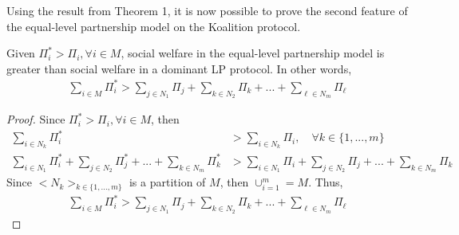 Using the result from Theorem 1, it is now possible to prove the second feature of the equal-level partnership model on the Koalition protocol.
%
\begin{corollary} \label{thm:welfare}
Given $\Pi_i^* > \Pi_i, \forall i \in M$, social welfare in the equal-level partnership model is greater than social welfare in a dominant LP protocol. In other words, 
\begin{align*}
\sum_{i \in M} \Pi_{i}^* >  \sum_{j \in N_1} \Pi_j + \sum_{k \in N_2} \Pi_k + ... + \sum_{\ell \in N_m} \Pi_\ell
\end{align*}
\end{corollary}
%
\begin{proof}
Since $\Pi_i^* > \Pi_i, \forall i \in M$, then
\begin{align*}
\sum_{i \in N_k} \Pi_i^* & > \sum_{i \in N_k} \Pi_i, \quad \forall k \in \{1,...,m\}  \\
\sum_{i \in N_1} \Pi_{i}^* + \sum_{j \in N_2} \Pi_{j}^* + ... + \sum_{k \in N_m} \Pi_{k}^* & > \sum_{i \in N_1} \Pi_i + \sum_{j \in N_2} \Pi_j + ... + \sum_{k \in N_m} \Pi_k
\end{align*}
%
Since $<N_k>_{k \in \{1,...,m\}}$ is a partition of $M$, then $\cup_{i = 1}^m = M$. Thus,
\begin{align*}
\sum_{i \in M} \Pi_{i}^* >  \sum_{j \in N_1} \Pi_j + \sum_{k \in N_2} \Pi_k + ... + \sum_{\ell \in N_m} \Pi_\ell
\end{align*}
\end{proof}
%

